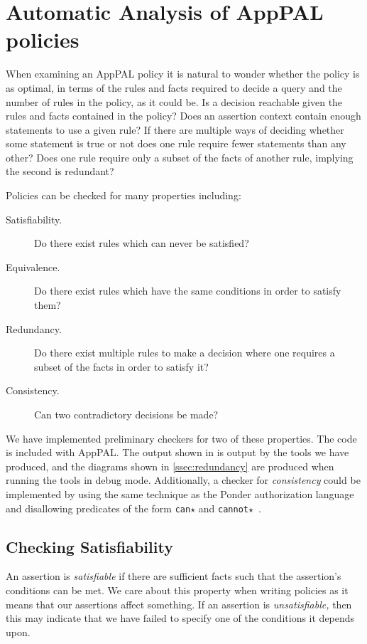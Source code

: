 \documentclass[thesis.tex]{subfiles}
\begin{document}
\section{Automatic Analysis of AppPAL policies}
\label{sec:lint}

When examining an AppPAL policy it is natural to wonder whether the
policy is as optimal, in terms of the rules and facts required to
decide a query and the number of rules in the policy, as it could
be. Is a decision reachable given the rules and facts contained in the
policy?  Does an assertion context contain enough statements to use a
given rule? If there are multiple ways of deciding whether some
statement is true or not does one rule require fewer statements than
any other? Does one rule require only a subset of the facts of another
rule, implying the second is redundant?

Policies can be checked for many properties including:
\begin{description}
\item[Satisfiability.] Do there exist rules which can never be satisfied?
\item[Equivalence.] Do there exist rules which have the same conditions in order to satisfy them?
\item[Redundancy.] Do there exist multiple rules to make a decision where one requires a subset of the facts in order to satisfy it?
\item[Consistency.] Can two contradictory decisions be made?
\end{description}

We have implemented preliminary checkers for two of these properties. The code
is included with AppPAL. The output shown in  is
output by the tools we have produced, and the diagrams shown in
\autoref{ssec:redundancy} are produced when running the tools in debug mode.
Additionally, a checker for \emph{consistency} could be implemented by using the
same technique as the Ponder authorization language and disallowing predicates
of the form \texttt{can$\star$} and
\texttt{cannot$\star$}~\cite{damianou_ponder_2001}.


\subsection{Checking Satisfiability}
\label{ssec:checking-satisfiability}

An assertion is \emph{satisfiable} if there are sufficient facts
such that the assertion's conditions can be met.  We care about this
property when writing policies as it means that our assertions affect
something.  If an assertion is \emph{unsatisfiable,} then this may
indicate that we have failed to specify one of the conditions it
depends upon.
\end{document}
